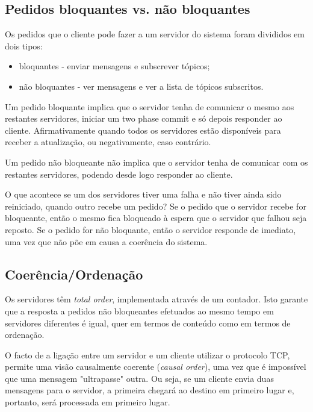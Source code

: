 \documentclass[a4paper]{report}
\begin{document}
		\subsection{Pedidos bloquantes vs. não bloquantes}

		Os pedidos que o cliente pode fazer a um servidor do sistema foram divididos em dois tipos: 
		\begin{itemize}
			\item bloquantes - enviar mensagens e subscrever tópicos;
			\item não bloquantes - ver mensagens e ver a lista de tópicos subscritos.
		\end{itemize}
		
		Um pedido bloquante implica que o servidor tenha de comunicar o mesmo aos restantes servidores, iniciar um two phase commit e só depois responder ao cliente.
		Afirmativamente quando todos os servidores estão disponíveis para receber a atualização, ou negativamente, caso contrário.

		Um pedido não bloqueante não implica que o servidor tenha de comunicar com os restantes servidores, podendo desde logo responder ao cliente.

		O que acontece se um dos servidores tiver uma falha e não tiver ainda sido reiniciado, quando outro recebe um pedido?
		Se o pedido que o servidor recebe for bloqueante, então o mesmo fica bloqueado à espera que o servidor que falhou seja reposto.
		Se o pedido for não bloquante, então o servidor responde de imediato, uma vez que não põe em causa a coerência do sistema.


		\subsection{Coerência/Ordenação}

		Os servidores têm \textit{total order}, implementada através de um contador. 
		Isto garante que a resposta a pedidos não bloqueantes efetuados ao mesmo tempo em servidores diferentes é igual, quer em termos de conteúdo como em termos de ordenação.

		O facto de a ligação entre um servidor e um cliente utilizar o protocolo TCP, permite uma visão causalmente coerente (\textit{causal order}), 
		uma vez que é impossível que uma mensagem "ultrapasse" outra. Ou seja, se um cliente envia duas mensagens para o servidor, a primeira chegará ao destino em primeiro lugar e, portanto, será processada em primeiro lugar.
\end{document}
